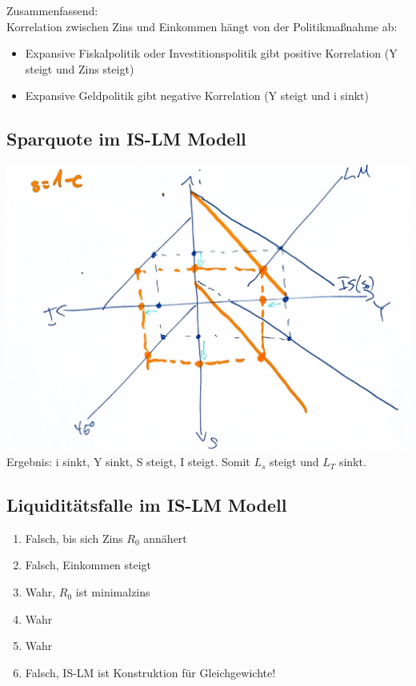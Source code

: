 \documentclass{scrartcl}
\begin{document}
\begin{enumerate}
\begin{enumerate}
Zusammenfassend:\\
Korrelation zwischen Zins und Einkommen h\"{a}ngt von der Politikma{\ss}nahme ab:
\begin{itemize}
  \item Expansive Fiskalpolitik oder Investitionspolitik gibt positive Korrelation (Y steigt und Zins steigt)
  \item Expansive Geldpolitik gibt negative Korrelation (Y steigt und i sinkt)
\end{itemize}
\end{enumerate}
\end{enumerate}

\subsection{Sparquote im IS-LM Modell}
\includegraphics[width=.75\textwidth]{Bilder/Keynes_IS_LM_Sparquote.pdf}\\
Ergebnis: i sinkt, Y sinkt, S steigt, I steigt. Somit $L_s$ steigt und $L_T$ sinkt.


\subsection{Liquidit\"{a}tsfalle im IS-LM Modell}
\begin{enumerate}
  \item Falsch, bis sich Zins $R_0$ ann\"{a}hert
  \item Falsch, Einkommen steigt
  \item Wahr, $R_0$ ist minimalzins
  \item Wahr
  \item Wahr
  \item Falsch, IS-LM ist Konstruktion f\"{u}r Gleichgewichte!
\end{enumerate}
\end{document}
